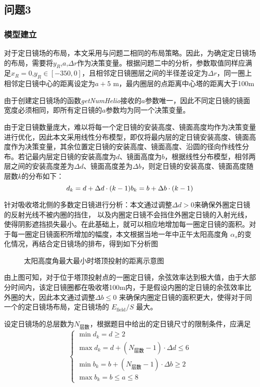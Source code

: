\subsection{问题3}
\subsubsection{模型建立}
对于定日镜场的布局，本文采用与问题二相同的布局策略。因此，为确定定日镜场的布局，需要将\(y_{R}\),\(a\),\(\Delta r\)作为决策变量。根据问题二中的分析，参数取值同样应满足\(x_{R} = 0\),\(y_{R} \in [-350, 0]\)，且相邻定日镜圈层之间的半径差设定为\(\Delta r\)，同一圈上相邻定日镜中心的距离设定为\(a+5\) m，最内圈层的点距离中心塔的距离大于100m

由于创建定日镜场的函数{\it getNumHelio}接收的\(a\)参数唯一，因此不同定日镜的镜面宽度必须相同，即所有定日镜的\(a\)参数均为同一个决策变量。

由于定日镜数量庞大，难以将每一个定日镜的安装高度、镜面高度均作为决策变量进行优化，因此本文采用线性分布模型，即仅将最内层的定日镜安装高度、镜面高度作为决策变量，其余位置定日镜的安装高度、镜面高度、沿圆的径向作线性分布。若记最内层定日镜的安装高度为\(d\)、镜面高度为\(b\)，根据线性分布模型，相邻两层之间的安装高度差为\(\Delta d\)、镜面高度差为\(\Delta b\)，则定日镜的安装高度、镜面高度随层数\(k\)的分布如下：
\begin{equation}
d_{k} = d + \Delta d\cdot (k-1)\\
b_{k} = b + \Delta b\cdot (k-1)
\end{equation}

针对吸收塔北侧的多数定日镜进行分析：本文通过调整\(\Delta d > 0\)来确保外圈定日镜的反射光线不被内圈的挡住，
以及内圈定日镜不会挡住外圈定日镜的入射光线，使得阴影遮挡损失最小。在此基础上，就可以相应地增加每一圈定日镜的面积。对于每一圈定日镜面积所增加的幅度，本文根据当地一年中正午太阳高度角 \(\alpha_{s}\)的变化情况，再结合定日镜场的排布，得到如下分析图
\begin{figure}[H]
\centering

\caption{太阳高度角最大最小时塔顶投射的距离示意图}\label{30_70}
\end{figure}

由上图可知，对于位于塔顶投射点的一圈定日镜，余弦效率达到极大值，由于大部分时间内，该定日镜圈都在吸收塔100m内，于是假设内圈的定日镜的余弦效率比外圈的大，因此本文通过调整\(\Delta b \le 0\) 来确保内圈定日镜的面积更大，使得对于同一个的定日镜场布局，定日镜场的
\(E_{\mathrm{field}} / S\)
最大。


设定日镜场的总层数为\(N_{\text{层数}}\)，根据题目中给出的定日镜尺寸的限制条件，应满足
\[
\begin{cases}
\min d_{k} = d \ge 2\\
\max d_{k} = d + (N_{\text{层数}}-1) \cdot \Delta d \le 6\\
\min b_{k} = b + (N_{\text{层数}}-1) \cdot \Delta b \ge 2\\
\max b_{k} = b \le a \le 8
\end{cases}
\]

